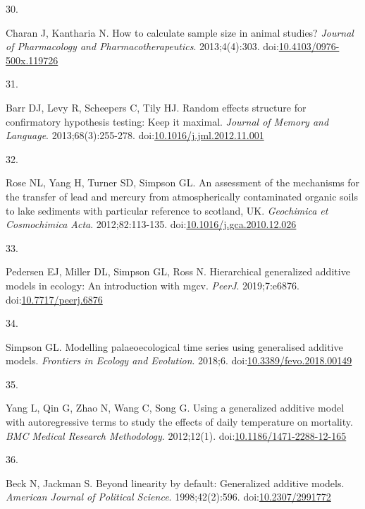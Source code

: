 \documentclass[
]{article}
\newlength{\cslhangindent}
\newlength{\csllabelwidth}
\newlength{\cslentryspacingunit} %
\newenvironment{CSLReferences}[2] %
 {%
  \setlength{\parindent}{0pt}
  \ifodd #1
  \let\oldpar\par
  \def\par{\hangindent=\cslhangindent\oldpar}
  \fi
  \setlength{\parskip}{#2\cslentryspacingunit}
 }%
 {}
\newcommand{\CSLLeftMargin}[1]{\parbox[t]{\csllabelwidth}{#1}}
\newcommand{\CSLRightInline}[1]{\parbox[t]{\linewidth - \csllabelwidth}{#1}\break}
\begin{document}
\begin{CSLReferences}{0}{0}
\leavevmode{}%
\CSLLeftMargin{30. }
\CSLRightInline{Charan J, Kantharia N. How to calculate sample size in animal studies? \emph{Journal of Pharmacology and Pharmacotherapeutics}. 2013;4(4):303. doi:\href{https://doi.org/10.4103/0976-500x.119726}{10.4103/0976-500x.119726}}

\leavevmode{}%
\CSLLeftMargin{31. }
\CSLRightInline{Barr DJ, Levy R, Scheepers C, Tily HJ. Random effects structure for confirmatory hypothesis testing: Keep it maximal. \emph{Journal of Memory and Language}. 2013;68(3):255-278. doi:\href{https://doi.org/10.1016/j.jml.2012.11.001}{10.1016/j.jml.2012.11.001}}

\leavevmode{}%
\CSLLeftMargin{32. }
\CSLRightInline{Rose NL, Yang H, Turner SD, Simpson GL. An assessment of the mechanisms for the transfer of lead and mercury from atmospherically contaminated organic soils to lake sediments with particular reference to scotland, {UK}. \emph{Geochimica et Cosmochimica Acta}. 2012;82:113-135. doi:\href{https://doi.org/10.1016/j.gca.2010.12.026}{10.1016/j.gca.2010.12.026}}

\leavevmode{}%
\CSLLeftMargin{33. }
\CSLRightInline{Pedersen EJ, Miller DL, Simpson GL, Ross N. Hierarchical generalized additive models in ecology: An introduction with mgcv. \emph{{PeerJ}}. 2019;7:e6876. doi:\href{https://doi.org/10.7717/peerj.6876}{10.7717/peerj.6876}}

\leavevmode{}%
\CSLLeftMargin{34. }
\CSLRightInline{Simpson GL. Modelling palaeoecological time series using generalised additive models. \emph{Frontiers in Ecology and Evolution}. 2018;6. doi:\href{https://doi.org/10.3389/fevo.2018.00149}{10.3389/fevo.2018.00149}}

\leavevmode{}%
\CSLLeftMargin{35. }
\CSLRightInline{Yang L, Qin G, Zhao N, Wang C, Song G. Using a generalized additive model with autoregressive terms to study the effects of daily temperature on mortality. \emph{{BMC} Medical Research Methodology}. 2012;12(1). doi:\href{https://doi.org/10.1186/1471-2288-12-165}{10.1186/1471-2288-12-165}}

\leavevmode{}%
\CSLLeftMargin{36. }
\CSLRightInline{Beck N, Jackman S. Beyond linearity by default: Generalized additive models. \emph{American Journal of Political Science}. 1998;42(2):596. doi:\href{https://doi.org/10.2307/2991772}{10.2307/2991772}}


\end{CSLReferences}
\end{document}
